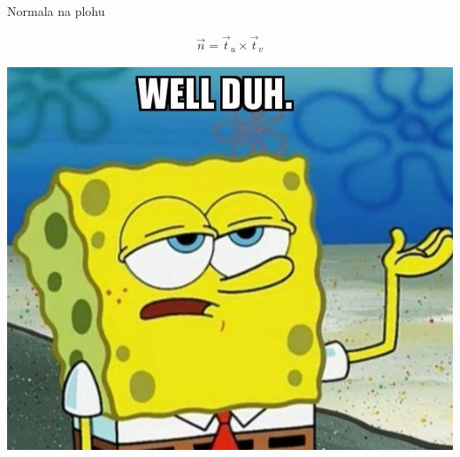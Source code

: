 \documentclass[9pt]{beamer}
\begin{document}
\begin{frame}{Normala na plohu}
	\begin{block}{}
		\begin{align*}
		\vec{n} = \vec{t}_u \times \vec{t}_v
		\end{align*}
	\end{block}
	
	\begin{center}
		\includegraphics[height=4.cm]{./slike/well-duh.jpg}
	\end{center}
\end{frame}	
\end{document}
